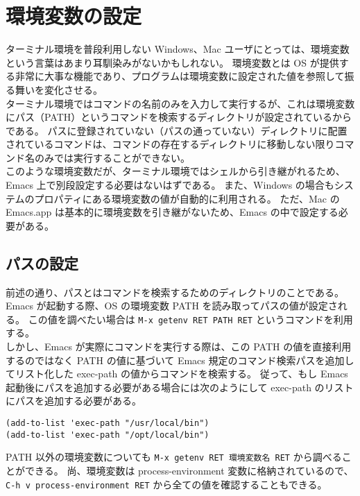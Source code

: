 \section{環境変数の設定}
ターミナル環境を普段利用しない Windows、Mac ユーザにとっては、環境変数という言葉はあまり耳馴染みがないかもしれない。\enlargethispage{1.00zw}
環境変数とは OS が提供する非常に大事な機能であり、プログラムは環境変数に設定された値を参照して振る舞いを変化させる。\\

ターミナル環境ではコマンドの名前のみを入力して実行するが、これは環境変数にパス（PATH）というコマンドを検索するディレクトリが設定されているからである。
パスに登録されていない（パスの通っていない）ディレクトリに配置されているコマンドは、コマンドの存在するディレクトリに移動しない限りコマンド名のみでは実行することができない。\\

このような環境変数だが、ターミナル環境ではシェルから引き継がれるため、Emacs 上で別段設定する必要はないはずである。
また、Windows の場合もシステムのプロパティにある環境変数の値が自動的に利用される。
ただ、Mac の Emacs.app は基本的に環境変数を引き継がないため、Emacs の中で設定する必要がある。
\subsection{パスの設定}
前述の通り、パスとはコマンドを検索するためのディレクトリのことである。
Emacs が起動する際、OS の環境変数 PATH を読み取ってパスの値が設定される。
この値を調べたい場合は \texttt{M-x getenv RET PATH RET} というコマンドを利用する。\\

しかし、Emacs が実際にコマンドを実行する際は、この PATH の値を直接利用するのではなく PATH の値に基づいて Emacs 規定のコマンド検索パスを追加してリスト化した exec-path の値からコマンドを検索する。
従って、もし Emacs 起動後にパスを追加する必要がある場合には次のようにして exec-path のリストにパスを追加する必要がある。
\begin{mdframed}[roundcorner=0.50zw,leftmargin=3.00zw,rightmargin=3.00zw,skipabove=0.40zw,skipbelow=0.40zw,innertopmargin=4.00pt,innerbottommargin=4.00pt,innerleftmargin=5.00pt,innerrightmargin=5.00pt,linecolor=gray!020,linewidth=0.50pt,backgroundcolor=gray!20]
\begin{verbatim}
(add-to-list 'exec-path "/usr/local/bin")
(add-to-list 'exec-path "/opt/local/bin")
\end{verbatim}
\end{mdframed}
PATH 以外の環境変数についても \texttt{M-x getenv RET 環境変数名 RET} から調べることができる。
尚、環境変数は process-environment 変数に格納されているので、\texttt{C-h v process-environment RET} から全ての値を確認することもできる。
